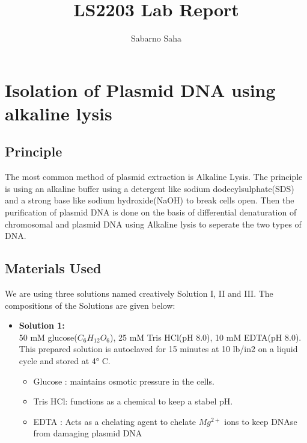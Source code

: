 \documentclass[a4paper]{article}
\title{LS2203 Lab Report}
\author{Sabarno Saha}
\begin{document}
\maketitle
\section{Isolation of Plasmid DNA using alkaline lysis}
\subsection{Principle}
The most common method of plasmid extraction is Alkaline Lysis. The principle is using an alkaline buffer 
using a detergent like sodium dodecylsulphate(SDS) and a strong base like sodium hydroxide(NaOH) to break 
cells open. Then the purification of plasmid DNA is done on the basis of differential denaturation of 
chromosomal and plasmid DNA using Alkaline lysis to seperate the two types of DNA.

\subsection{Materials Used}
We are using three solutions named creatively Solution I, II and III. The compositions of the Solutions 
are given below:
\begin{itemize}
    \item \textbf{Solution 1: }\\ 
         50 mM glucose($C_6H_{12}O_6$), 25 mM Tris HCl(pH 8.0), 10 mM EDTA(pH 8.0). This prepared solution 
         is autoclaved for 15 minutes at 10 lb/in2 on a liquid cycle and stored at 4° C.
         \begin{itemize}
           \item Glucose : maintains osmotic pressure in the cells.
           \item Tris HCl: functions as a chemical to keep a stabel pH.
            \item  EDTA : Acts as a chelating agent to chelate $Mg^{2+}$ ions to keep DNAse from damaging 
                plasmid DNA
         \end{itemize}
\end{itemize}


    
\end{document}
